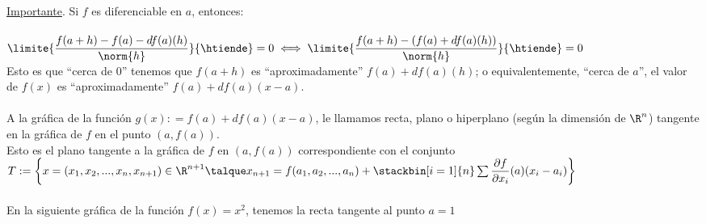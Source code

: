 	\begin{lema}\underline{Importante}. Si $f$ es diferenciable en $a$, entonces:\\\\
	$\limite{\dfrac{f(a+h)-f(a)-df(a)(h)}{\norm{h}}}{\htiende}=0\iff\limite{\dfrac{f(a+h)-(f(a)+df(a)(h))}{\norm{h}}}{\htiende}=0$\\
	Esto es que ``cerca de 0'' tenemos que $f(a+h)$ es ``aproximadamente'' $f(a)+df(a)(h)$; o equivalentemente, ``cerca de $a$'', el valor de $f(x)$ es ``aproximadamente'' $f(a)+df(a)(x-a)$.\\\\
	A la gráfica de la función $g(x)\colon=f(a)+df(a)(x-a)$, le llamamos recta, plano o hiperplano (según la dimensión de $\R^n$) tangente en la gráfica de $f$ en el punto $(a,f(a))$.\\
	Esto es el plano tangente a la gráfica de $f$ en $(a,f(a))$ correspondiente con el conjunto\\ $T:=\left\{x=(x_1,x_2,...,x_n,x_{n+1})\in \R^{n+1}\talque x_{n+1}=f(a_1,a_2,...,a_n)+\stackbin[i=1]{n}\sum\dfrac{\partial f}{\partial x_i}(a)(x_i-a_i)\right\}$\\\\
	En la siguiente gráfica de la función $f(x)=x^2$, tenemos la recta tangente al punto $a=1$
	\begin{figura}\ \\
	\end{figura}
	\end{lema}
	
